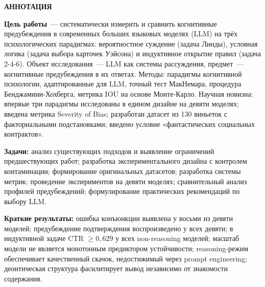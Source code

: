 \begin{titlepage}
\noindent\textbf{АННОТАЦИЯ}

\vspace{0.5cm}

\noindent\textbf{Цель работы}~--- систематически измерить и сравнить когнитивные предубеждения в современных больших языковых моделях (LLM) на трёх психологических парадигмах: вероятностное суждение (задача Линды), условная логика (задача выбора карточек Уэйсона) и индуктивное открытие правил (задача 2-4-6). Объект исследования~--- LLM как системы рассуждения, предмет~--- когнитивные предубеждения в их ответах. Методы: парадигмы когнитивной психологии, адаптированные для LLM, точный тест МакНемара, процедура Бенджамини-Хохберга, метрика IOU на основе Монте-Карло. Научная новизна: впервые три парадигмы исследованы в едином дизайне на девяти моделях; введена метрика Severity of Bias; разработан датасет из 130 виньеток с факториальными подстановками; введено условие «фантастических социальных контрактов».

\vspace{0.5cm}

\noindent\textbf{Задачи:} анализ существующих подходов и выявление ограничений предшествующих работ; разработка экспериментального дизайна с контролем контаминации; формирование оригинальных датасетов; разработка системы метрик; проведение экспериментов на девяти моделях; сравнительный анализ профилей предубеждений; формулирование практических рекомендаций по выбору LLM.

\vspace{0.5cm}

\noindent\textbf{Краткие результаты:} ошибка конъюнкции выявлена у восьми из девяти моделей; предубеждение подтверждения воспроизведено у всех девяти; в индуктивной задаче CTR $\geq 0{,}629$ у всех non-reasoning моделей; масштаб модели не является монотонным предиктором устойчивости; reasoning-режим обеспечивает качественный скачок, недостижимый через prompt engineering; деонтическая структура фасилитирует вывод независимо от знакомости содержания.

\end{titlepage}
